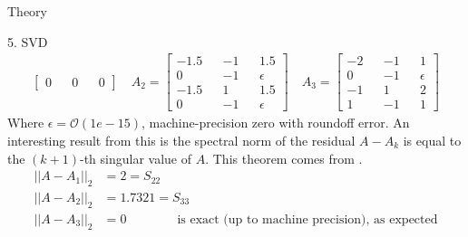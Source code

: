 \begin{section}{Theory}
\begin{homeworkSection}{5. SVD}
{\begin{align*}
\begin{bmatrix}
        0 && 0 && 0\end{bmatrix} \quad 
        A_2 = \begin{bmatrix} -1.5 && -1 && 1.5\\ 
        0 && -1 && \epsilon \\ 
        -1.5 && 1 && 1.5\\ 
        0 && -1 && \epsilon \end{bmatrix}  \quad
        A_3 = \begin{bmatrix} -2 && -1 && 1\\ 
        0 && -1 && \epsilon \\ 
        -1 && 1 && 2\\ 
        1 && -1 && 1\end{bmatrix}
    \end{align*}
    Where $\epsilon = \mathcal{O}(1e-15)$, machine-precision zero with roundoff error.
    An interesting result from this is the spectral norm of the residual $A-A_k$ is equal to the $(k+1)$-th singular value of $A$. This theorem comes from \cite{stanford}.
    \begin{align*}
        || A - A_1 ||_2 &= 2 = S_{22}\\
        || A - A_2 ||_2 &= 1.7321 = S_{33}\\
        || A - A_3 ||_2 &= 0  \qquad \qquad \text{is exact (up to machine precision), as expected}\\
    \end{align*}
}
\end{homeworkSection}

\end{section}

